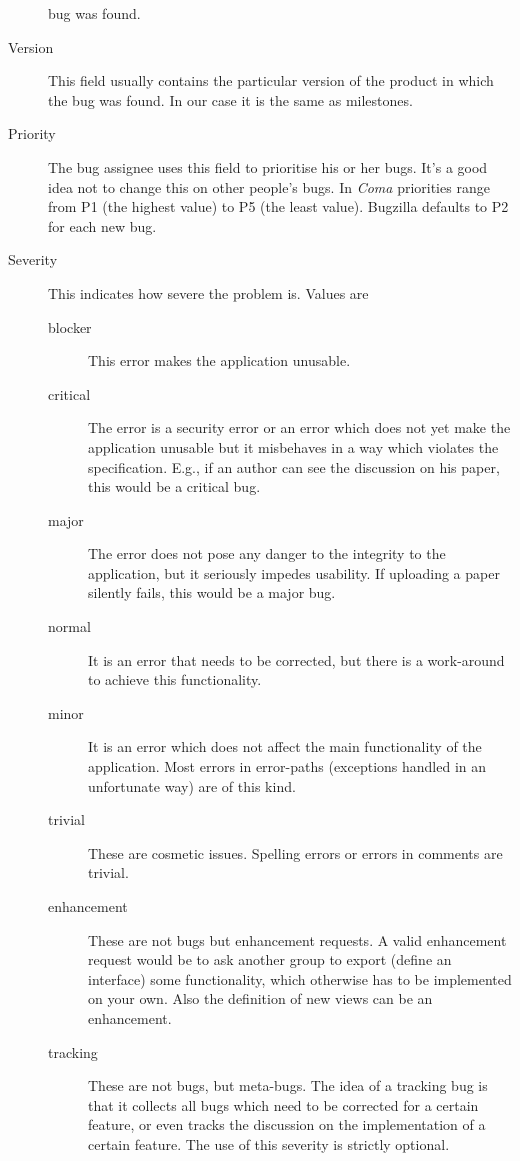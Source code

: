 \documentclass[11pt,handout]{handout}
\newcommand{\Coma}{\textsl{Coma}}
\begin{document}
\begin{description}
  bug was found.
\item[Version]  This field usually contains the particular version of the
  product in which the bug was found.  In our case it is the same as
  milestones.
\item[Priority]  The bug assignee uses this field to prioritise his or her
  bugs.  It's a good idea not to change this on other people's bugs.  In
  {\Coma} priorities range from P1 (the highest value) to P5 (the least
  value).  Bugzilla defaults to P2 for each new bug.
\item[Severity]  This indicates how severe the problem is.  Values are
  \begin{description}
  \item[blocker]  This error makes the application unusable.
  \item[critical]  The error is a security error or an error which does not
    yet make the application unusable but it misbehaves in a way which
    violates the specification.  E.g., if an author can see the discussion
    on his paper, this would be a critical bug.
  \item[major]  The error does not pose any danger to the integrity to the
    application, but it seriously impedes usability.  If uploading a paper
    silently fails, this would be a major bug.
  \item[normal]  It is an error that needs to be corrected, but there is
    a work-around to achieve this functionality.
  \item[minor]  It is an error which does not affect the main functionality
    of the application.  Most errors in error-paths (exceptions handled in
    an unfortunate way) are of this kind.
  \item[trivial]  These are cosmetic issues.  Spelling errors or errors in
    comments are trivial.
  \item[enhancement]  These are not bugs but enhancement requests.  A valid
    enhancement request would be to ask another group to export (define an
    interface) some functionality, which otherwise has to be implemented on
    your own.  Also the definition of new views can be an enhancement.
  \item[tracking]  These are not bugs, but meta-bugs.  The idea of a
    tracking bug is that it collects all bugs which need to be corrected
    for a certain feature, or even tracks the discussion on the
    implementation of a certain feature.  The use of this severity is
    strictly optional.
  \end{description}

\end{description}
\end{document}
